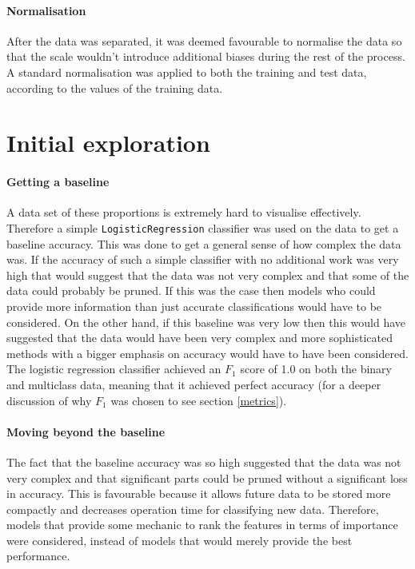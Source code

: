 \documentclass[british]{article}
\newcommand{\code}[1]{\texttt{#1}}
\begin{document}
	\paragraph{Normalisation} After the data was separated, it was deemed favourable to normalise the data so that the scale wouldn't introduce additional biases during the rest of the process. A standard normalisation was applied to both the training and test data, according to the values of the training data. 
	
	\section{Initial exploration}
	
	
	\paragraph{Getting a baseline}A data set of these proportions is extremely hard to visualise effectively. Therefore a simple \code{LogisticRegression} classifier was used on the data to get a baseline accuracy. This was done to get a general sense of how complex the data was. If the accuracy of such a simple classifier with no additional work was very high that would suggest that the data was not very complex and that some of the data could probably be pruned. If this was the case then models who could provide more information than just accurate classifications would have to be considered. On the other hand, if this baseline was very low then this would have suggested that the data would have been very complex and more sophisticated methods with a bigger emphasis on accuracy would have to have been considered. The logistic regression classifier achieved an $F_1$ score of 1.0 on both the binary and multiclass data, meaning that it achieved perfect accuracy (for a deeper discussion of why $F_1$ was chosen to see section \ref{metrics}).
	
	
	\paragraph{Moving beyond the baseline} The fact that the baseline accuracy was so high suggested that the data was not very complex and that significant parts could be pruned without a significant loss in accuracy. This is favourable because it allows future data to be stored more compactly and decreases operation time for classifying new data. Therefore, models that provide some mechanic to rank the features in terms of importance were considered, instead of models that would merely provide the best performance. 
	
\end{document}
